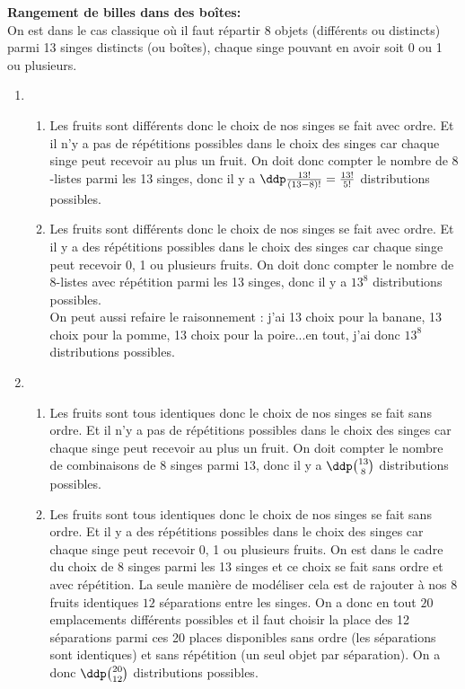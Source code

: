 \documentclass[a4paper, 11pt]{article}
\begin{document}
\begin{correction}  \; \textbf{Rangement de billes dans des bo\^ites:}\\
	\noindent On est dans le cas classique o\`u il faut r\'epartir 8 objets (diff\'erents ou distincts) parmi 13 singes distincts (ou bo\^ites), chaque singe pouvant en avoir soit 0 ou 1 ou plusieurs.
	\begin{enumerate}
		\item
		      \begin{enumerate}
			      \item Les fruits sont diff\'erents donc le choix de nos singes se fait avec ordre. Et il n'y a pas de r\'ep\'etitions possibles dans le choix des singes car chaque singe peut recevoir au plus un fruit. On doit donc compter le nombre de $8$-listes parmi les 13 singes, donc il y a $\ddp \frac{13!}{(13-8)!} = \frac{13!}{5!}$ distributions possibles.
			      \item Les fruits sont diff\'erents donc le choix de nos singes se fait avec ordre. Et il y a des r\'ep\'etitions possibles dans le choix des singes car chaque singe peut recevoir 0, 1 ou plusieurs fruits. On doit donc compter le nombre de $8$-listes avec r\'ep\'etition parmi les 13 singes, donc il y a $13^8$ distributions possibles.\\
			            On peut aussi refaire le raisonnement : j'ai 13 choix pour la banane, 13 choix pour la pomme, 13 choix pour la poire...en tout, j'ai donc $13^8$ distributions possibles.
		      \end{enumerate}
		\item
		      \begin{enumerate}
			      \item Les fruits sont tous identiques donc le choix de nos singes se fait sans ordre. Et il n'y a pas de r\'ep\'etitions possibles dans le choix des singes car chaque singe peut recevoir au plus un fruit. On doit compter le nombre de combinaisons de $8$ singes parmi $13$, donc il y a $\ddp \binom{13}{8}$ distributions possibles.
			      \item Les fruits sont tous identiques donc le choix de nos singes se fait sans ordre. Et il y a des r\'ep\'etitions possibles dans le choix des singes car chaque singe peut recevoir 0, 1 ou plusieurs fruits. On est dans le cadre du choix de 8 singes parmi les 13 singes et ce choix se fait sans ordre et avec r\'ep\'etition. La seule mani\`ere de mod\'eliser cela est de rajouter \`a nos 8 fruits identiques $12$ s\'eparations entre les singes. On a donc en tout $20$ emplacements diff\'erents possibles et il faut choisir la place des 12 s\'eparations parmi ces 20 places disponibles sans ordre (les s\'eparations sont identiques) et sans r\'ep\'etition (un seul objet par s\'eparation). On a donc $\ddp \binom{20}{12}$ distributions possibles.
		      \end{enumerate}
	\end{enumerate}
\end{correction}
\end{document}
